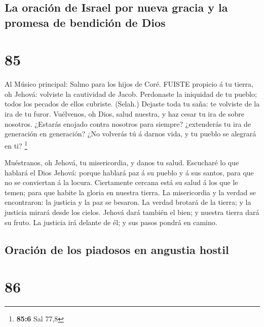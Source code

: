 \hypertarget{la-oraciuxf3n-de-israel-por-nueva-gracia-y-la-promesa-de-bendiciuxf3n-de-dios}{%
\subsection{La oración de Israel por nueva gracia y la promesa de
bendición de
Dios}\label{la-oraciuxf3n-de-israel-por-nueva-gracia-y-la-promesa-de-bendiciuxf3n-de-dios}}

\hypertarget{section-84}{%
\section{85}\label{section-84}}

 Al Músico principal: Salmo para los hijos de Coré. FUISTE
propicio á tu tierra, oh Jehová: volviste la cautividad de Jacob.
 Perdonaste la iniquidad de tu pueblo; todos los pecados de
ellos cubriste. (Selah.)  Dejaste toda tu saña: te volviste
de la ira de tu furor.  Vuélvenos, oh Dios, salud nuestra, y
haz cesar tu ira de sobre nosotros.  ¿Estarás enojado contra
nosotros para siempre? ¿extenderás tu ira de generación en generación?
 ¿No volverás tú á darnos vida, y tu pueblo se alegrará en
ti? \footnote{\textbf{85:6} Sal 77,8}

 Muéstranos, oh Jehová, tu misericordia, y danos tu salud.
 Escucharé lo que hablará el Dios Jehová: porque hablará paz
á su pueblo y á sus santos, para que no se conviertan á la locura.
 Ciertamente cercana está su salud á los que le temen; para
que habite la gloria en nuestra tierra.  La misericordia y
la verdad se encontraron: la justicia y la paz se besaron. 
La verdad brotará de la tierra; y la justicia mirará desde los cielos.
 Jehová dará también el bien; y nuestra tierra dará su
fruto.  La justicia irá delante de él; y sus pasos pondrá
en camino.

\hypertarget{oraciuxf3n-de-los-piadosos-en-angustia-hostil}{%
\subsection{Oración de los piadosos en angustia
hostil}\label{oraciuxf3n-de-los-piadosos-en-angustia-hostil}}

\hypertarget{section-85}{%
\section{86}\label{section-85}}


